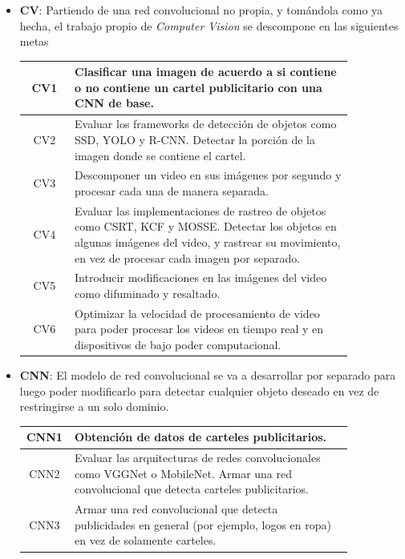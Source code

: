 \documentclass[a4paper]{article}
\begin{document}
\begin{itemize}
\item \textbf{CV}: Partiendo de una red convolucional no propia, y tomándola como ya hecha, el trabajo propio de \emph{Computer Vision} se descompone en las siguientes metas

\begin{center}
\begin{tabular}{c m{0.85\linewidth}} \toprule
    CV1 & Clasificar una imagen de acuerdo a si contiene o no contiene un cartel publicitario con una CNN de base. \\ \midrule
    CV2 & Evaluar los frameworks de detección de objetos como SSD, YOLO y R-CNN. \newline Detectar la porción de la imagen donde se contiene el cartel. \\ \midrule
    CV3 & Descomponer un video en sus imágenes por segundo y procesar cada una de manera separada. \\ \midrule
    CV4 & Evaluar las implementaciones de rastreo de objetos como CSRT, KCF y MOSSE. \newline Detectar los objetos en algunas imágenes del video, y rastrear su movimiento, en vez de procesar cada imagen por separado. \\ \midrule
    CV5 & Introducir modificaciones en las imágenes del video como difuminado y resaltado. \\ \midrule
    CV6 & Optimizar la velocidad de procesamiento de video para poder procesar los videos en tiempo real y en dispositivos de bajo poder computacional. \\ \bottomrule
\end{tabular}
\end{center}

\item \textbf{CNN}: El modelo de red convolucional se va a desarrollar por separado para luego poder modificarlo para detectar cualquier objeto deseado en vez de restringirse a un solo dominio.

\begin{center}
\begin{tabular}{c m{0.85\linewidth}} \toprule
    CNN1 & Obtención de datos de carteles publicitarios. \\ \midrule
    CNN2 & Evaluar las arquitecturas de redes convolucionales como VGGNet o MobileNet. \newline Armar una red convolucional que detecta carteles publicitarios. \\ \midrule
    CNN3 & Armar una red convolucional que detecta publicidades en general (por ejemplo, logos en ropa) en vez de solamente carteles. \\ \bottomrule
\end{tabular}
\end{center}


\end{itemize}
\end{document}
